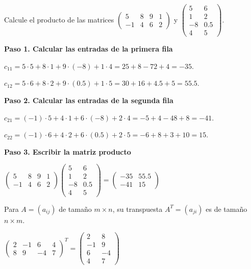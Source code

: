 \begin{example}
Calcule el producto de las matrices $\begin{pmatrix} 5 & 8 & 9 & 1 \\ -1 & 4 & 6 & 2 \end{pmatrix}$ y $\begin{pmatrix} 5 & 6 \\ 1 & 2 \\ -8 & 0.5 \\ 4 & 5 \end{pmatrix}$.
\begin{myproof}
\textbf{Paso 1. Calcular las entradas de la primera fila}

$c_{11} = 5\cdot5 + 8\cdot1 + 9\cdot(-8) + 1\cdot4 = 25 + 8 - 72 + 4 = -35.$

$c_{12} = 5\cdot6 + 8\cdot2 + 9\cdot(0.5) + 1\cdot5 = 30 + 16 + 4.5 + 5 = 55.5.$

\textbf{Paso 2. Calcular las entradas de la segunda fila}

$c_{21} = (-1)\cdot5 + 4\cdot1 + 6\cdot(-8) + 2\cdot4 = -5 + 4 - 48 + 8 = -41.$

$c_{22} = (-1)\cdot6 + 4\cdot2 + 6\cdot(0.5) + 2\cdot5 = -6 + 8 + 3 + 10 = 15.$

\textbf{Paso 3. Escribir la matriz producto}

\(
\boxed{\begin{pmatrix} 5 & 8 & 9 & 1 \\ -1 & 4 & 6 & 2 \end{pmatrix}
\begin{pmatrix} 5 & 6 \\ 1 & 2 \\ -8 & 0.5 \\ 4 & 5 \end{pmatrix}
= \begin{pmatrix} -35 & 55.5 \\ -41 & 15 \end{pmatrix}}
\)
\end{myproof}
\end{example}

\begin{definition}
Para $A = (a_{ij})$ de tamaño $m \times n$, su transpuesta $A^T = (a_{ji})$ es de tamaño $n \times m$.
\end{definition}
\begin{example} $\begin{pmatrix} 2 & -1 & 6 & 4 \\ 8 & 9 & -4 & 7 \end{pmatrix}^T = \begin{pmatrix} 2 & 8 \\ -1 & 9 \\ 6 & -4 \\ 4 & 7 \end{pmatrix}$
\end{example}

